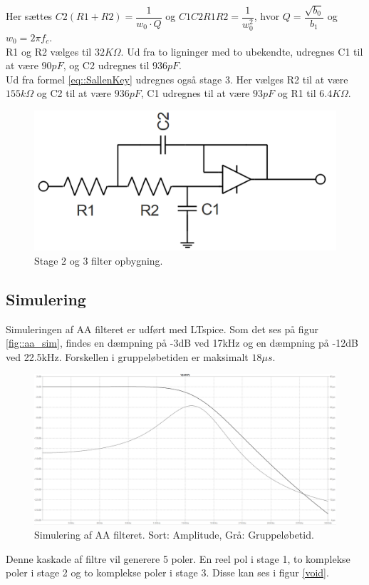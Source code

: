 Her sættes $C2(R1+R2) = \dfrac{1}{w_0\cdot Q}$ og $C1C2R1R2 = \dfrac{1}{w_0^2}$, hvor $Q = \dfrac{\sqrt{b_0}}{b_1}$ og $w_0 = 2 \pi  f_c$.
\\R1 og R2 vælges til $32K\Omega$. Ud fra to ligninger med to ubekendte, udregnes C1 til at være $90pF$, og C2 udregnes til $936pF$.\\
Ud fra formel \ref{eq::SallenKey} udregnes også stage 3. Her vælges R2 til at være $155k\Omega$ og C2 til at være $936pF$, C1 udregnes til at være $93pF$ og R1 til $6.4K\Omega$. 
\begin{figure}[h!]
	\centering
	\includegraphics[scale=0.3]{./billeder/stage23}
	\caption{Stage 2 og 3 filter opbygning.}
	\label{fig::filter_stage2}
\end{figure}
\FloatBlock
\subsection{Simulering}
Simuleringen af AA filteret er udført med LTspice. Som det ses på figur \ref{fig::aa_sim}, findes en dæmpning på -3dB ved 17kHz og en dæmpning på -12dB ved 22.5kHz. Forskellen i gruppeløbetiden er maksimalt $18 \mu s$.
\begin{figure}[h!]
	\centering
	\includegraphics[scale=0.2]{./billeder/aa_sim1}
	\caption{Simulering af AA filteret. Sort: Amplitude, Grå: Gruppeløbetid.}
	\label{fig::afilter_aasim}
\end{figure}
\FloatBlock
Denne kaskade af filtre vil generere 5 poler. En reel pol i stage 1, to komplekse poler i stage 2 og to komplekse poler i stage 3. Disse kan ses i figur \ref{void}.

